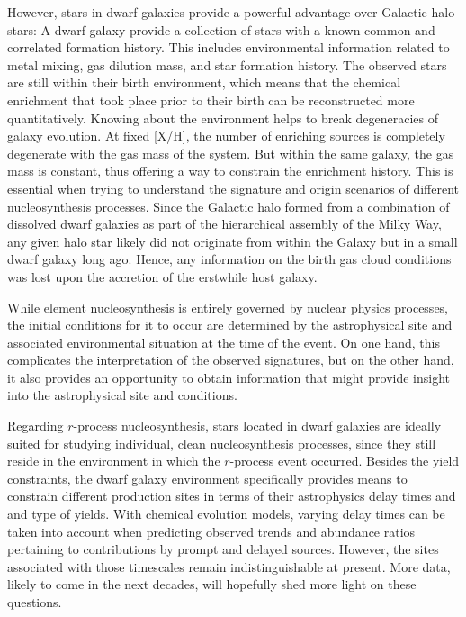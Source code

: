 \documentclass[letterpaper]{article}
\begin{document}
However, stars in dwarf galaxies provide a powerful advantage over Galactic halo stars:
A dwarf galaxy provide a collection of stars with a known common and correlated formation history. This includes environmental information related to metal mixing, gas dilution mass, and star formation history. The observed stars are still within their birth environment, which means that the chemical enrichment that took place prior to their birth can be reconstructed more quantitatively. Knowing about the environment helps to break degeneracies of galaxy evolution. At fixed [X/H], the number of enriching sources is completely degenerate with the gas mass of the system. But within the same galaxy, the gas mass is constant, thus offering a way to constrain the enrichment history. 
This is essential when trying to understand the signature and origin scenarios of different nucleosynthesis processes. Since the Galactic halo formed from a combination of dissolved dwarf galaxies as part of the hierarchical assembly of the Milky Way, any given halo star likely did not originate from within the Galaxy but in a small dwarf galaxy long ago. Hence, any information on the birth gas cloud conditions was lost upon the accretion of the erstwhile host galaxy.

While element nucleosynthesis is entirely governed by nuclear physics processes, the initial conditions for it to occur are determined by the astrophysical site and associated environmental situation at the time of the event. On one hand, this complicates the interpretation of the observed signatures, but on the other hand, it also provides an opportunity to obtain information that might provide insight into the astrophysical site and conditions. 

Regarding $r$-process nucleosynthesis, stars located in dwarf galaxies are ideally suited for studying individual, clean nucleosynthesis processes, since they still reside in the environment in which the $r$-process event occurred. Besides the yield constraints, the dwarf galaxy environment specifically provides means to constrain different production sites in terms of their astrophysics delay times and and type of yields. With chemical evolution models, varying delay times can be taken into account when  predicting observed trends and abundance ratios pertaining to contributions by prompt and delayed sources. However, the sites associated with those timescales remain indistinguishable at present. More data, likely to come in the next decades, will hopefully shed more light on these questions.
\end{document}
